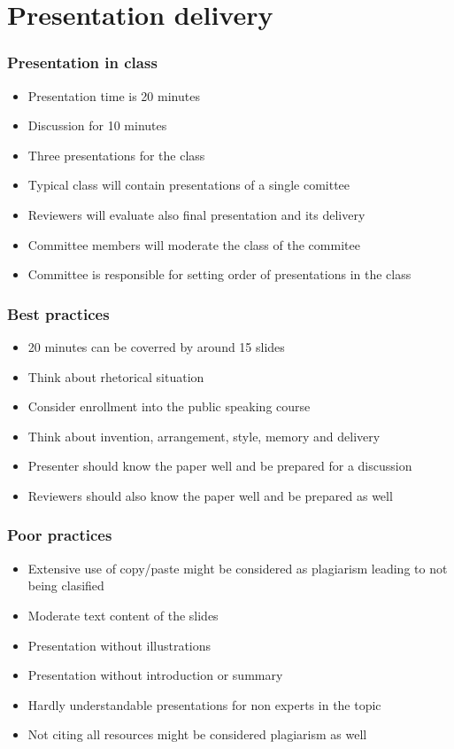 \section{Presentation delivery}

\begin{frame}
\frametitle{Presentation in class}
\begin{itemize}
\item Presentation time is 20 minutes
\item Discussion for 10 minutes
\item Three presentations for the class
\item Typical class will contain presentations of a single comittee
\item Reviewers will evaluate also final presentation and its delivery
\item Committee members will moderate the class of the commitee
\item Committee is responsible for setting order of presentations in the class
\end{itemize}
\end{frame}

\begin{frame}
\frametitle{Best practices}
\begin{itemize}
\item 20 minutes can be coverred by around 15 slides
\item Think about rhetorical situation
\item Consider enrollment into the public speaking course
\item Think about invention, arrangement, style, memory and delivery
\item Presenter should know the paper well and be prepared for a discussion
\item Reviewers should also know the paper well and be prepared as well
\end{itemize}
\end{frame}

\begin{frame}
\frametitle{Poor practices}
\begin{itemize}
\item Extensive use of copy/paste might be considered as plagiarism leading to not being clasified
\item Moderate text content of the slides
\item Presentation without illustrations
\item Presentation without introduction or summary
\item Hardly understandable presentations for non experts in the topic
\item Not citing all resources might be considered plagiarism as well
\end{itemize}
\end{frame}

